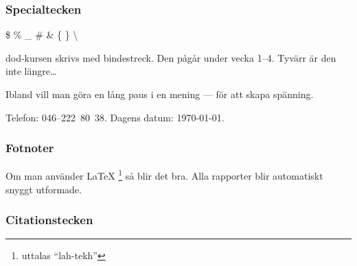 \begin{frame}[fragile,t]
  \frametitle{Specialtecken}

  \begin{itemize}
  \end{itemize}

  \begin{envs}
    \begin{Code}
      \$ \% \_ \# \& \{ \} \textbackslash
    \end{Code}
  \end{envs}

  
  \begin{exlatex}
dod-kursen skrivs med bindestreck.
Den pågår under vecka 1--4.
Tyvärr är den inte längre\ldots

Ibland vill man göra en lång paus i en mening --- för att skapa spänning.

\quad Telefon: 046--222~80~38. 
Dagens datum: \today.
  \end{exlatex}
\end{frame}


\begin{frame}[fragile,t]
  \frametitle{Fotnoter}
  \vspace{2em}


  \begin{exlatex}
  Om man använder \LaTeX
  \footnote{uttalas
    ``lah-tekh''} så
  blir det bra. Alla rapporter
  blir automatiskt snyggt
  utformade.
  \end{exlatex}

  \blankline
  \begin{itemize}
  \end{itemize}

\end{frame}

\begin{frame}[fragile,t]
  \frametitle{Citationstecken}
  \vspace{3em}


  \begin{itemize}
  \end{itemize}

\end{frame}

